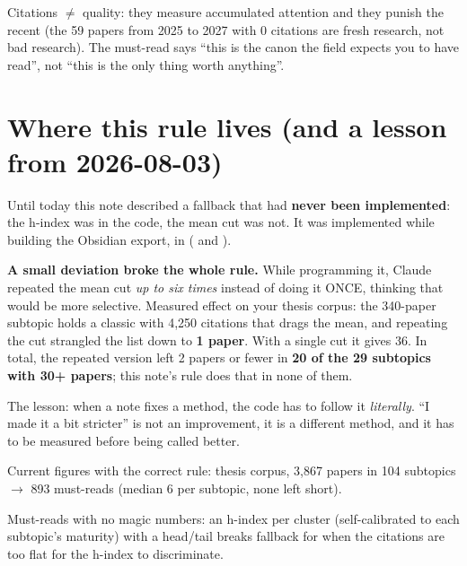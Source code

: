 \documentclass[11pt,a4paper]{article}
\begin{document}
\begin{ojo}
Citations $\neq$ quality: they measure accumulated attention and they punish the recent (the 59
papers from 2025 to 2027 with 0 citations are fresh research, not bad research). The must-read
says ``this is the canon the field expects you to have read'', not ``this is the only thing
worth anything''.
\end{ojo}

\section{Where this rule lives (and a lesson from 2026-08-03)}

Until today this note described a fallback that had \textbf{never been implemented}: the
h-index was in the code, the mean cut was not. It was implemented while building the
Obsidian export, in  ( and
).

\begin{ojo}
\textbf{A small deviation broke the whole rule.} While programming it, Claude repeated the
mean cut \emph{up to six times} instead of doing it ONCE, thinking that would be more
selective. Measured effect on your thesis corpus: the 340-paper subtopic holds a classic
with 4,250 citations that drags the mean, and repeating the cut strangled the list down to
\textbf{1 paper}. With a single cut it gives 36. In total, the repeated version left 2
papers or fewer in \textbf{20 of the 29 subtopics with 30+ papers}; this note's rule does
that in none of them.

The lesson: when a note fixes a method, the code has to follow it \emph{literally}. ``I made
it a bit stricter'' is not an improvement, it is a different method, and it has to be
measured before being called better.
\end{ojo}

Current figures with the correct rule: thesis corpus, 3,867 papers in 104 subtopics
$\rightarrow$ 893 must-reads (median 6 per subtopic, none left short).

\begin{resumen}
Must-reads with no magic numbers: an h-index per cluster (self-calibrated to each subtopic's
maturity) with a head/tail breaks fallback for when the citations are too flat for the h-index
to discriminate.
\end{resumen}
\clearpage
{}
{}
\end{document}
